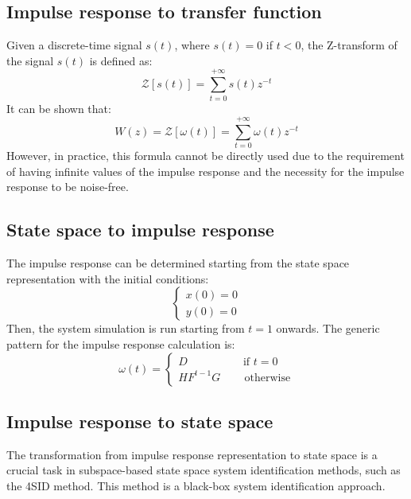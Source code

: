 \subsection{Impulse response to transfer function}
Given a discrete-time signal $s(t)$, where $s(t)=0$ if $t<0$, the Z-transform of the signal $s(t)$ is defined as: 
\[\mathcal{Z}[s(t)]=\sum_{t=0}^{+\infty}s(t)z^{-t}\]
It can be shown that:
\[W(z)=\mathcal{Z}[\omega(t)]=\sum_{t=0}^{+\infty}\omega(t)z^{-t}\]
However, in practice, this formula cannot be directly used due to the requirement of having infinite values of the impulse response and the necessity for the impulse response to be noise-free.

\subsection{State space to impulse response}
The impulse response can be determined starting from the state space representation with the initial conditions:
\[\begin{cases}
    x(0)=0 \\
    y(0)=0
\end{cases}\]
Then, the system simulation is run starting from $t=1$ onwards. 
The generic pattern for the impulse response calculation is:
\[\omega(t)=\begin{cases}
    D \qquad\qquad\quad\text{if } t=0 \\
    HF^{t-1}G   \qquad \, \text{otherwise}
\end{cases}\]

\subsection{Impulse response to state space}
The transformation from impulse response representation to state space is a crucial task in subspace-based state space system identification methods, such as the 4SID method. 
This method is a black-box system identification approach.